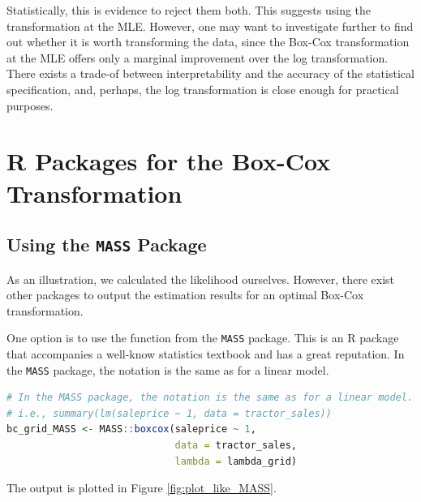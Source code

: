 \documentclass[11pt]{book}
\begin{document}
Statistically, this is evidence to reject them both.
This suggests using the transformation at the MLE.
However, one may want to investigate further 
to find out whether it is worth 
transforming the data, 
since the Box-Cox transformation at the MLE offers only a marginal improvement over the log transformation. 
There exists a trade-of between interpretability and 
the accuracy of the statistical specification, 
and, perhaps, the log transformation is close enough 
for practical purposes. 


\clearpage
\section{\textsf{R} Packages for the Box-Cox Transformation}
\subsection*{Using the \texttt{MASS} Package}

As an illustration, we calculated
the likelihood ourselves.
However, there exist other packages
to output the estimation results for
an optimal Box-Cox transformation.

One option is to use the function from the \texttt{MASS} package.
This is an \textsf{R} package that accompanies a well-know statistics textbook
and has a great reputation. 
In the \texttt{MASS} package, the notation is the same as for a linear model.


\begin{lstlisting}[language=R]
# In the MASS package, the notation is the same as for a linear model.
# i.e., summary(lm(saleprice ~ 1, data = tractor_sales))
bc_grid_MASS <- MASS::boxcox(saleprice ~ 1,
                             data = tractor_sales,
                             lambda = lambda_grid)
\end{lstlisting}

The output is plotted in Figure \ref{fig:plot_like_MASS}.
\end{document}
